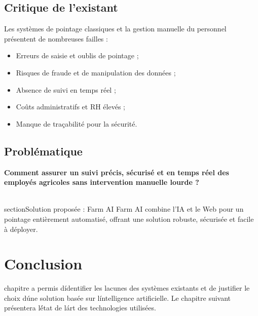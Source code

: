\documentclass[12pt,a4paper]{report}
\numberwithin{figure}{chapter}
\numberwithin{table}{chapter}
\begin{document}
\subsection{Critique de l'existant}
Les systèmes de pointage classiques et la gestion manuelle du personnel présentent de nombreuses
failles :

\begin{warningbox}
  \begin{itemize}
    \item Erreurs de saisie et oublis de pointage ;
    \item Risques de fraude et de manipulation des données ;
    \item Absence de suivi en temps réel ;
    \item Coûts administratifs et RH élevés ;
    \item Manque de traçabilité pour la sécurité.
  \end{itemize}
\end{warningbox}

\subsection{Problématique}
\textbf{Comment assurer un suivi précis, sécurisé et en temps réel des employés agricoles sans
intervention manuelle lourde ?}

\\section{Solution proposée : Farm AI}
Farm AI combine l'IA et le Web pour un pointage entièrement automatisé, offrant une solution
robuste, sécurisée et facile à déployer.

\section{Conclusion}\nCe chapitre a permis d\'identifier les lacunes des systèmes existants et de justifier le choix d\'une solution basée sur l\'intelligence artificielle. Le chapitre suivant présentera l\'état de l\'art des technologies utilisées.\n\n%
\end{document}
